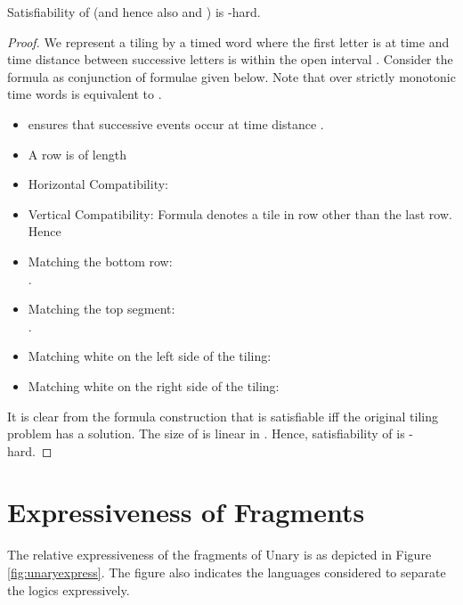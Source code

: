 \documentclass{llncs}
\newcommand{\mitlfp}{\mbox{}}
\newcommand{\pspace}{\mbox{}}
\begin{document}
\begin{theorem} \label{theo:pspacehard} 
Satisfiability of  (and hence also  and ) is \pspace-hard.
\end{theorem}
\begin{proof}
We represent a tiling  by a timed word  where the first letter is at time  and time distance between successive letters is within the open interval . Consider the  formula  as conjunction of formulae given below. Note that over strictly monotonic time words  is equivalent to .
 \begin{itemize}
 \item  ensures that successive events occur at time distance .
 \item A row is of length  \\

\item
 Horizontal Compatibility: 
 \item
 Vertical Compatibility:  Formula   denotes a tile  in  row other than the last row. Hence \\
  
 \item Matching the bottom row:\\
   .
 \item Matching the top segment:\\
   .
 \item Matching white on the left side of the tiling:\\
  
 \item Matching white on the right side of the tiling:\\
 
\end{itemize}  
It is clear from the formula construction that  
is satisfiable iff the original tiling problem has a solution. The size of  is linear in . Hence, satisfiability of  is 
\pspace-hard. 
\end{proof}


\section{Expressiveness of \mitlfp\/ Fragments}
\label{app:express}
The relative expressiveness of the fragments of Unary \mitlfp\/ is as depicted in Figure \ref{fig:unaryexpress}. The figure also indicates the languages considered to separate the logics expressively.
\end{document}
